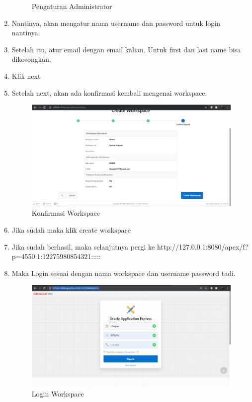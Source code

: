 \documentclass{article}
\begin{document}
\begin{enumerate}
\begin{figure}[!htbp]
        \caption{Pengaturan Administrator}
    \end{figure}
    \item Nantinya, akan mengatur nama username dan password untuk login nantinya.
    \item Setelah itu, atur email dengan email kalian. Untuk first dan last name bisa dikosongkan.
    \item Klik next
    \item Setelah next, akan ada konfirmasi kembali mengenai workspace.
    \begin{figure}[!htbp]
        \centering
        \includegraphics[scale=0.3]{LangkahKeenam.PNG}
        \caption{Konfirmasi Workspace}
    \end{figure}
    \item Jika sudah maka klik create workspace
\newpage
    \item Jika sudah berhasil, maka selanjutnya pergi ke http://127.0.0.1:8080/apex/f?p=4550:1:12275980854321:::::
    \item Maka Login sesuai dengan nama workspace dan username password tadi.
    \begin{figure}[!htbp]
        \centering
        \includegraphics[scale=0.3]{LangkahKetujuh.PNG}
        \caption{Login Workspace}

\end{figure}
\end{enumerate}
\end{document}
